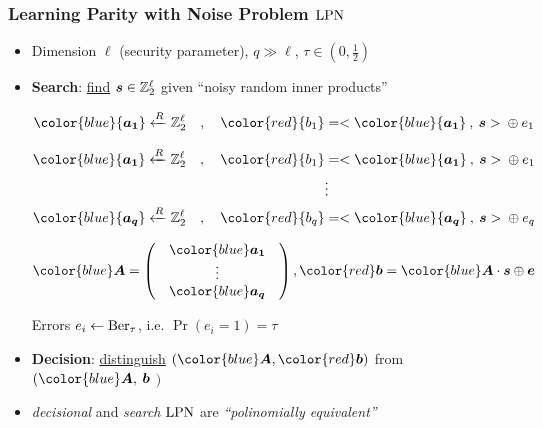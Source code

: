 \begin{frame}
\frametitle{Learning Parity with Noise Problem $\mathrm{LPN}$}
\begin{itemize}[<+->]
 \item Dimension $\ell$ (security parameter), $q \gg \ell$, $\tau \in \left( 0,\frac{1}{2} \right)$
 \vspace*{5pt}
 \item \textbf{Search}: \underline{find}  $ \boldsymbol{s} \in \mathbb{Z}_2^{\ell}$ given ``noisy random inner products'' \\
 \begin{overprint}
 \begin{align*}
  {\color{blue}{\vect{a_1}}} \R \zol \quad , \quad {\color{red}{b_1}} &= <{\color{blue}{\vect{a_1}}} \: , \: \vect{s}> \: \xor \: e_1 \\  
  \end{align*}

  \begin{align*}
  {\color{blue}{\vect{a_1}}} \R \zol \quad , \quad {\color{red}{b_1}} &= <{\color{blue}{\vect{a_1}}} \: , \: \vect{s}> \: \xor \: e_1 \\
   & \vdots \\
   {\color{blue}{\vect{a_q}}} \R \zol \quad, \quad  {\color{red}{b_q}} &= <{\color{blue}{\vect{a_q}}} \: , \: \vect{s}> \: \xor \: e_q \\
  \end{align*}

  \vspace*{15pt}
\[
{\color{blue} \vect{A}} = \begin{pmatrix}
            & {\color{blue}\vect{a_1}} & \\
            & \vdots  & \\ 
            & {\color{blue}\vect{a_q}} & 
           \end{pmatrix}  , {\color{red} \vect{b}} = {\color{blue} \vect{A}} \cdot \vect{s} \xor \vect{e} 
\]
 \end{overprint}
  Errors $e_i \gets \mathrm{Ber}_{\tau}$, i.e. $\Pr(e_i=1)= \tau$
\end{itemize}
\vspace{5pt}

  \begin{itemize}
    \item<5-> \textbf{Decision}: \underline{distinguish} $\left( {\color{blue}\vect{A}}, {\color{red}\vect{b}} \right)$ from {\color{blue}{uniform}} $( {\color{blue}\vect{A}}, $ {\color{blue} $\boldsymbol{b}$} $)$ 
\vspace{5pt}
    \item<6-> \emph{decisional} and \emph{search} $\mathrm{LPN}$ are \emph{``polinomially equivalent''} \\ 
 \end{itemize}
\end{frame}

